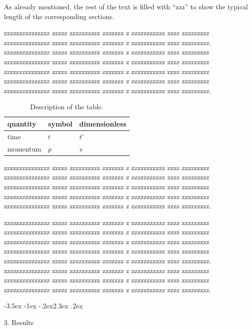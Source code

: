 \documentclass[prl,twocolumn]{revtex4-1}
\makeatletter
\renewcommand{\section}{\@startsection{section}{1}{\z@}%
	{-3.5ex \@plus -1ex \@minus -.2ex}{2.3ex \@plus.2ex}%
	{\normalfont\bfseries\raggedright}}
\makeatother
\begin{document}
  As already mentioned, the rest of the text is filled with ``zzz'' to show the typical length of the corresponding sections.


  zzzzzzzzzzzzzzz zzzzz zzzzzzzzzz zzzzzzz z zzzzzzzzzzz zzzz zzzzzzzzz
  zzzzzzzzzzzzzzz zzzzz zzzzzzzzzz zzzzzzz z zzzzzzzzzzz zzzz zzzzzzzzz.
  zzzzzzzzzzzzzzz zzzzz zzzzzzzzzz zzzzzzz z zzzzzzzzzzz zzzz zzzzzzzzz
  zzzzzzzzzzzzzzz zzzzz zzzzzzzzzz zzzzzzz z zzzzzzzzzzz zzzz zzzzzzzzz
  zzzzzzzzzzzzzzz zzzzz zzzzzzzzzz zzzzzzz z zzzzzzzzzzz zzzz zzzzzzzzz
  zzzzzzzzzzzzzzz zzzzz zzzzzzzzzz zzzzzzz z zzzzzzzzzzz zzzz zzzzzzzzz
  zzzzzzzzzzzzzzz zzzzz zzzzzzzzzz zzzzzzz z zzzzzzzzzzz zzzz zzzzzzzzz.


  
\begin{table}[!b]
\begin{center}
\begin{tabular}{lll}
quantity & symbol & dimensionless \\
\hline
time & $t$ & $t'$  \\
momentum & $p$ & $v$
\end{tabular}
\end{center}
\caption{Description of the table.}
\label{tab:1}
\end{table}


  
  zzzzzzzzzzzzzzz zzzzz zzzzzzzzzz zzzzzzz z zzzzzzzzzzz zzzz zzzzzzzzz
  zzzzzzzzzzzzzzz zzzzz zzzzzzzzzz zzzzzzz z zzzzzzzzzzz zzzz zzzzzzzzz
  zzzzzzzzzzzzzzz zzzzz zzzzzzzzzz zzzzzzz z zzzzzzzzzzz zzzz zzzzzzzzz
  zzzzzzzzzzzzzzz zzzzz zzzzzzzzzz zzzzzzz z zzzzzzzzzzz zzzz zzzzzzzzz
  zzzzzzzzzzzzzzz zzzzz zzzzzzzzzz zzzzzzz z zzzzzzzzzzz zzzz zzzzzzzzz.


  zzzzzzzzzzzzzzz zzzzz zzzzzzzzzz zzzzzzz z zzzzzzzzzzz zzzz zzzzzzzzz
  zzzzzzzzzzzzzzz zzzzz zzzzzzzzzz zzzzzzz z zzzzzzzzzzz zzzz zzzzzzzzz
  zzzzzzzzzzzzzzz zzzzz zzzzzzzzzz zzzzzzz z zzzzzzzzzzz zzzz zzzzzzzzz
  zzzzzzzzzzzzzzz zzzzz zzzzzzzzzz zzzzzzz z zzzzzzzzzzz zzzz zzzzzzzzz
  zzzzzzzzzzzzzzz zzzzz zzzzzzzzzz zzzzzzz z zzzzzzzzzzz zzzz zzzzzzzzz.
  zzzzzzzzzzzzzzz zzzzz zzzzzzzzzz zzzzzzz z zzzzzzzzzzz zzzz zzzzzzzzz
  zzzzzzzzzzzzzzz zzzzz zzzzzzzzzz zzzzzzz z zzzzzzzzzzz zzzz zzzzzzzzz
  zzzzzzzzzzzzzzz zzzzz zzzzzzzzzz zzzzzzz z zzzzzzzzzzz zzzz zzzzzzzzz.
 


\section{3. Results}
\end{document}
